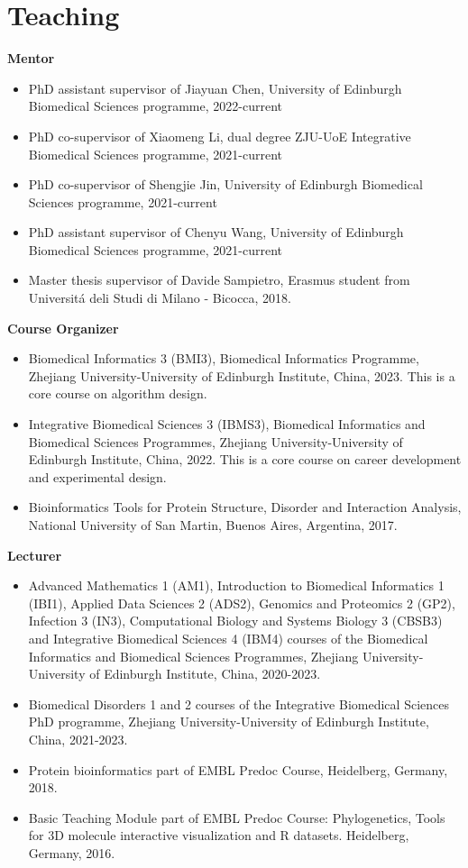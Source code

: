 \documentclass[11pt,a4paper,sans]{moderncv} %
\begin{document}
\section{Teaching}
\vspace{-.1cm}
\textbf{Mentor}
\begin{itemize}
  \item PhD assistant supervisor of Jiayuan Chen, University of Edinburgh Biomedical Sciences programme, 2022-current
  \item PhD co-supervisor of Xiaomeng Li, dual degree ZJU-UoE Integrative Biomedical Sciences programme, 2021-current
  \item PhD co-supervisor of Shengjie Jin, University of Edinburgh Biomedical Sciences programme, 2021-current
  \item PhD assistant supervisor of Chenyu Wang, University of Edinburgh Biomedical Sciences programme, 2021-current
  \item Master thesis supervisor of Davide Sampietro, Erasmus student from Universit\'a deli Studi di Milano - Bicocca, 2018.
\end{itemize}
\vspace{.1cm}
\textbf{Course Organizer}
\begin{itemize}
  \item Biomedical Informatics 3 (BMI3), Biomedical Informatics Programme, Zhejiang University-University of Edinburgh Institute, China, 2023. This is a core course on algorithm design.
  \item Integrative Biomedical Sciences 3 (IBMS3), Biomedical Informatics and Biomedical Sciences Programmes, Zhejiang University-University of Edinburgh Institute, China, 2022. This is a core course on career development and experimental design.
  \item Bioinformatics Tools for Protein Structure, Disorder and Interaction Analysis, National University of San Martin, Buenos Aires, Argentina, 2017.
\end{itemize}
\vspace{.1cm}
\textbf{Lecturer}
\begin{itemize}
  \item Advanced Mathematics 1 (AM1), Introduction to Biomedical Informatics 1 (IBI1), Applied Data Sciences 2 (ADS2), Genomics and Proteomics 2 (GP2), Infection 3 (IN3), Computational Biology and Systems Biology 3 (CBSB3) and Integrative Biomedical Sciences 4 (IBM4) courses of the Biomedical Informatics and Biomedical Sciences Programmes, Zhejiang University-University of Edinburgh Institute, China, 2020-2023.
  \item Biomedical Disorders 1 and 2 courses of the Integrative Biomedical Sciences PhD programme, Zhejiang University-University of Edinburgh Institute, China, 2021-2023.
  \item Protein bioinformatics part of EMBL Predoc Course, Heidelberg, Germany, 2018.
  \item Basic Teaching Module part of EMBL Predoc Course: Phylogenetics, Tools for 3D molecule interactive visualization and R datasets. Heidelberg, Germany, 2016.
\end{itemize}
\end{document}
